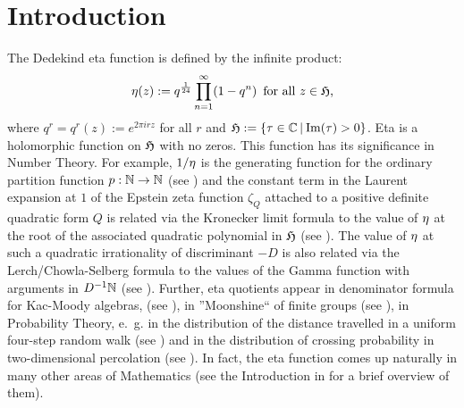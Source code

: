 \documentclass[a4paper,11pt]{amsart}
\begin{document}
 \section{Introduction}
\label{intro}
The Dedekind eta function is defined by the infinite product:\hypertarget{queue}{}
 \begin{equation} \eta(z):=q^{\frac{1}{24}}\prod_{n=1}^\infty(1-q^n)\hspace{5pt}\text{for all $z\in\mathfrak{H}$,}
\label{17.4Aug}\end{equation} 
where $q^r=q^r(z):=e^{2\pi irz}$ for all $r$ %
and 
$\H:=\{\tau\in\C\hs\idi\operatorname{Im}(\tau)>0\}$. %
Eta is a holomorphic function on $\mathfrak{H}$ with no zeros.
This function has its significance in Number Theory. For example, 
$1/\eta$ is the generating function for the ordinary partition function $p:\mathbb{N}\rightarrow\mathbb{N}$
(see \cite{ak})
and 
 the constant term in the Laurent
 expansion at 
 $1$ of 
the Epstein zeta function $\zeta_Q$ 
attached to a positive definite quadratic form $Q$ is related
 via the Kronecker limit formula to
the value of $\eta$
at the root of the associated quadratic polynomial in $\mathfrak{H}$ (see \cite{coh}).
The value of $\eta$ at such a quadratic irrationality of discriminant $-D$
is also related via the Lerch/Chowla-Selberg formula to  the values of the Gamma function 
with arguments in $D^{-1}\mathbb{N}$ 
 \hspace{.5pt}(see 
  \cite{pw}). 
   Further, eta quotients %
  appear in %
  denominator formula for Kac-Moody algebras,
   (see %
   \cite{k}), %
 in %
 ''Moonshine`` of finite groups (see \cite{h}),
in Probability Theory, e.~g. in the distribution of the distance travelled in a uniform four-step
random walk (see \cite{bswz})
and in the distribution of crossing probability in two-dimensional percolation (see \cite{kz}).
In fact, the eta function
comes up naturally in many other areas of Mathematics (see the Introduction in \cite{B-three} for a brief
overview of them). 
\end{document}

